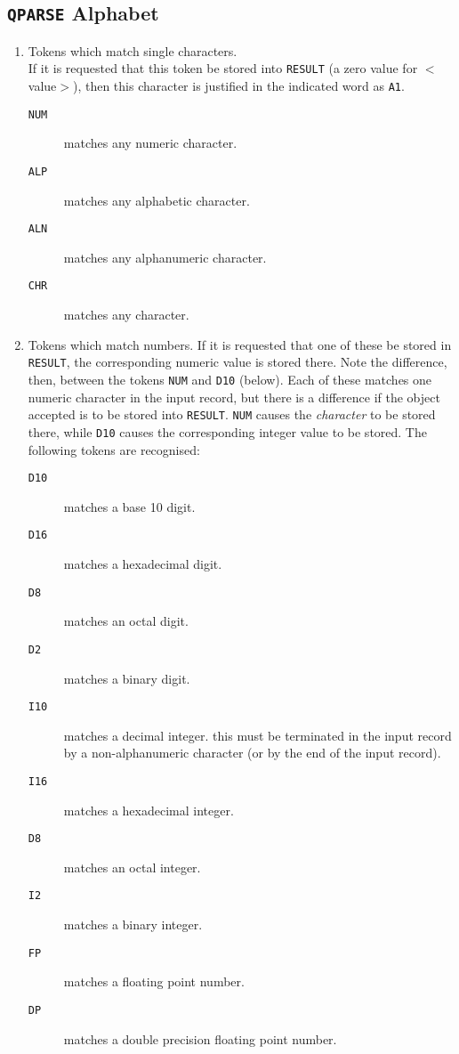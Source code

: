 \subsection{{\tt QPARSE} Alphabet}
\begin{enumerate}
\item  Tokens which match single characters. \\
If it is requested that
this token be stored into {\tt RESULT} (a zero value for $<$value$>$), then this
character is justified in the indicated word as {\tt A1}.
\begin{description}
\item[{\tt NUM}]    matches any numeric character.
\item[{\tt ALP}]    matches any alphabetic character.
\item[{\tt ALN}]    matches any alphanumeric character.
\item[{\tt CHR}]    matches any character.
\end{description}
\item Tokens which match numbers. If it is requested that one of these be
stored in {\tt RESULT}, the corresponding numeric value is stored there.
Note the difference, then, between the tokens {\tt NUM} and {\tt D10} 
(below).
Each of these matches one numeric character in the input record, but
there is a difference if the object accepted is to be stored into
{\tt RESULT}. {\tt NUM} causes the {\em character} to be stored there, while 
{\tt D10}
causes the corresponding integer value to be stored. The following
tokens are recognised:
\begin{description}
\item[{\tt D10}]    matches a base 10 digit.
\item[{\tt D16}]    matches a hexadecimal digit.
\item[{\tt D8}]     matches an octal digit.
\item[{\tt D2}]     matches a binary digit.
\item[{\tt I10}]    matches a decimal integer. this must be terminated
in the input record by a non-alphanumeric character (or
by the end of the input record).
\item[{\tt I16}]    matches a hexadecimal integer.
\item[{\tt D8}]     matches an octal integer.
\item[{\tt I2}]     matches a binary integer.
\item[{\tt FP}]     matches a floating point number.
\item[{\tt DP}]     matches a double precision floating point number.

\end{description}
\end{enumerate}
